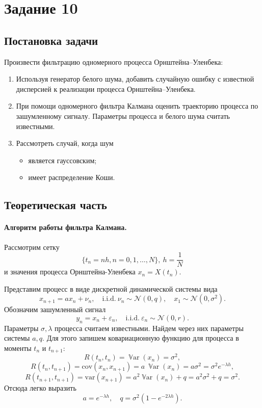 \documentclass[16pt]{article}
\DeclareMathOperator*{\Var}{\mathbb{V}ar}
\begin{document}
\newpage
\section{Задание 10}
\subsection{Постановка задачи}
Произвести фильтрацию одномерного процесса Орнштейна--Уленбека:
\begin{enumerate}
	\item Используя генератор белого шума, добавить случайную ошибку с известной дисперсией к реализации процесса Орнштейна--Уленбека.
	\item При помощи одномерного фильтра Калмана оценить траекторию процесса по зашумленному сигналу. Параметры процесса и белого шума считать известными.
	\item Рассмотреть случай, когда шум
	\begin{itemize}
		\item является гауссовским;
		\item имеет распределение Коши.
	\end{itemize}
\end{enumerate}

\subsection{Теоретическая часть}
\paragraph{Алгоритм работы фильтра Калмана.}
Рассмотрим сетку $$\{t_n = nh, n = 0, 1, \ldots, N\},\ h = \dfrac1N$$ и значения процесса Орнштейна-Уленбека
$x_n = X(t_n).$

Представим процесс в виде дискретной динамической системы вида
$$x_{n+1} = ax_n + \nu_n, \quad \mathrm{i.i.d.}\ \nu_n \sim \mathcal{N}(0, q), \quad x_1 \sim \mathcal{N}(0, \sigma^2).$$
Обозначим зашумленный сигнал
$$y_n = x_n + \varepsilon_n, \quad \mathrm{i.i.d.}\ \varepsilon_n \sim \mathcal{N}(0, r).$$
Параметры $\sigma, \lambda$ процесса считаем известными. Найдем через них параметры системы $a, q$. Для этого запишем ковариационную функцию для процесса в моменты $t_n$ и $t_{n+1}$:
$$R(t_n, t_n) = \Var(x_n) = \sigma^2,$$
$$R(t_n, t_{n+1}) = \mathrm{cov}(x_n, x_{n+1}) = a\ \Var(x_n) = a\sigma^2 = \sigma^2 e^{-\lambda h},$$
$$R(t_{n+1}, t_{n+1}) = \mathrm{var}(x_{n+1}) = a^2\Var(x_n) + q = a^2\sigma^2 + q = \sigma^2.$$
Отсюда легко выразить
$$a = e^{-\lambda h}, \quad q = \sigma^2(1 - e^{-2\lambda h}).$$
\end{document}
